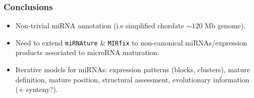 \begin{frame}[t]
    \frametitle{Conclusions}
    \begin{itemize}
        \item Non-trivial miRNA annotation (i.e simplified chordate $\sim120$ Mb genome).
        \item Need to extend \texttt{miRNAture} \& \texttt{MIRfix} to non-canonical miRNAs/expression products associated to microRNA maturation.
        \item Iterative models for miRNAs: expression patterns (blocks, clusters), mature definition, mature position, structural assessment, evolutionary information (+ synteny?).
    \end{itemize}
\end{frame}
